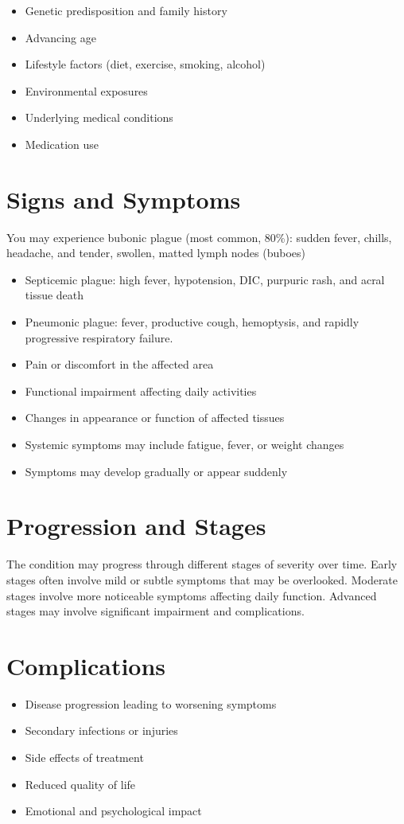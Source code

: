 \begin{itemize}[noitemsep]
  \item Genetic predisposition and family history
  \item Advancing age
  \item Lifestyle factors (diet, exercise, smoking, alcohol)
  \item Environmental exposures
  \item Underlying medical conditions
  \item Medication use
\end{itemize}
\section{Signs and Symptoms}
You may experience bubonic plague (most common, 80\%): sudden fever, chills, headache, and tender, swollen, matted lymph nodes (buboes)

\begin{itemize}[noitemsep]
  \item Septicemic plague: high fever, hypotension, DIC, purpuric rash, and acral tissue death
  \item Pneumonic plague: fever, productive cough, hemoptysis, and rapidly progressive respiratory failure.
  \item Pain or discomfort in the affected area
  \item Functional impairment affecting daily activities
  \item Changes in appearance or function of affected tissues
  \item Systemic symptoms may include fatigue, fever, or weight changes
  \item Symptoms may develop gradually or appear suddenly
\end{itemize}
\section{Progression and Stages}
The condition may progress through different stages of severity over time. Early stages often involve mild or subtle symptoms that may be overlooked. Moderate stages involve more noticeable symptoms affecting daily function. Advanced stages may involve significant impairment and complications.
\section{Complications}
\begin{itemize}[noitemsep]
  \item Disease progression leading to worsening symptoms
  \item Secondary infections or injuries
  \item Side effects of treatment
  \item Reduced quality of life
  \item Emotional and psychological impact
\end{itemize}
